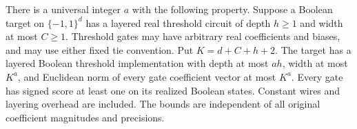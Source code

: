 \begin{lemma}
\label{lem:critical-weight-independent-threshold-compiler}
There is a universal integer $a$ with the following property. Suppose
a Boolean target on $\{-1,1\}^d$ has a layered real threshold circuit
of depth $h\ge1$ and width at most $C\ge1$. Threshold gates may have
arbitrary real coefficients and biases, and may use either fixed tie
convention. Put $K=d+C+h+2$.
The target has a layered Boolean threshold implementation with depth
at most $ah$, width at most $K^a$, and Euclidean norm of every gate
coefficient vector at most $K^a$. Every gate has signed score at least
one on its realized Boolean states. Constant wires and layering
overhead are included. The bounds are independent of all original
coefficient magnitudes and precisions.
\end{lemma}

